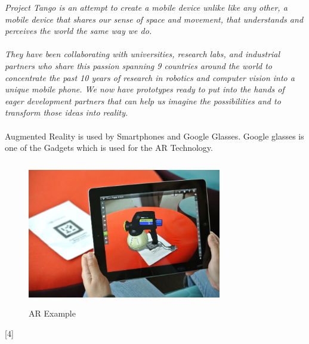  \textit{ Project Tango is an attempt to create a mobile device unlike like any other, a mobile device that shares our sense of space and movement, that understands and perceives the world the same way we do.\cite{Tango}}
 \\
 \\
 \textit{
 They have been collaborating with universities, research labs, and industrial partners who share this passion spanning 9 countries around the world to concentrate the past 10 years of research in robotics and computer vision into a unique mobile phone. We now have prototypes ready to put into the hands of eager development partners that can help us imagine the possibilities and to transform those ideas into reality.\cite{Tango}
 }
 \\
 \\
 Augmented Reality is used by Smartphones and Google Glasses. Google glasses is one of the Gadgets which is used for the AR Technology.
 \begin{figure}[htbp]
 \centering
 \includegraphics[width=240pt,height=180pt,keepaspectratio]{graphics/ARpad.png}
 \caption{AR Example\cite{ARpad}}
 \end{figure}
 [4]\\
 \\
